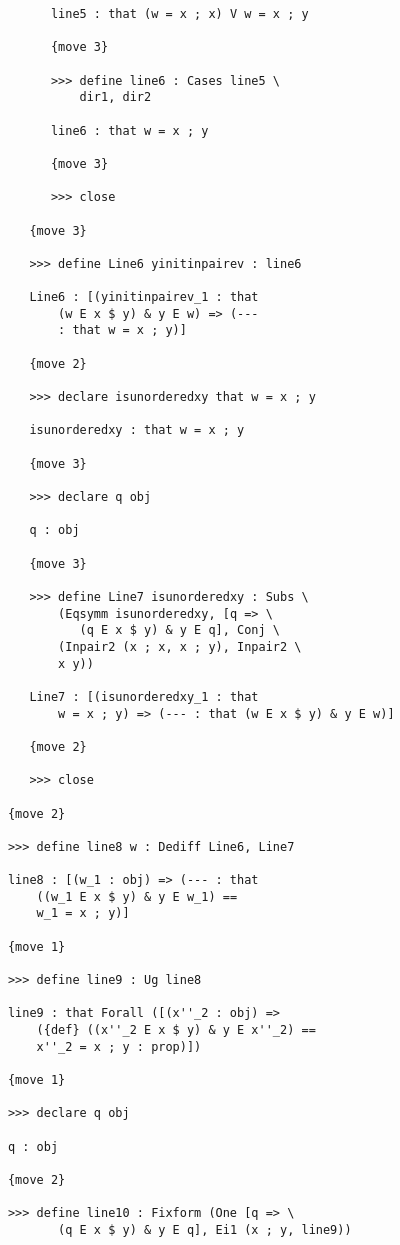 \documentclass[12pt]{article}
\begin{document}
\begin{verbatim}
            line5 : that (w = x ; x) V w = x ; y

            {move 3}

            >>> define line6 : Cases line5 \
                dir1, dir2

            line6 : that w = x ; y

            {move 3}

            >>> close

         {move 3}

         >>> define Line6 yinitinpairev : line6

         Line6 : [(yinitinpairev_1 : that 
             (w E x $ y) & y E w) => (--- 
             : that w = x ; y)]

         {move 2}

         >>> declare isunorderedxy that w = x ; y

         isunorderedxy : that w = x ; y

         {move 3}

         >>> declare q obj

         q : obj

         {move 3}

         >>> define Line7 isunorderedxy : Subs \
             (Eqsymm isunorderedxy, [q => \
                (q E x $ y) & y E q], Conj \
             (Inpair2 (x ; x, x ; y), Inpair2 \
             x y))

         Line7 : [(isunorderedxy_1 : that 
             w = x ; y) => (--- : that (w E x $ y) & y E w)]

         {move 2}

         >>> close

      {move 2}

      >>> define line8 w : Dediff Line6, Line7

      line8 : [(w_1 : obj) => (--- : that 
          ((w_1 E x $ y) & y E w_1) == 
          w_1 = x ; y)]

      {move 1}

      >>> define line9 : Ug line8

      line9 : that Forall ([(x''_2 : obj) => 
          ({def} ((x''_2 E x $ y) & y E x''_2) == 
          x''_2 = x ; y : prop)])

      {move 1}

      >>> declare q obj

      q : obj

      {move 2}

      >>> define line10 : Fixform (One [q => \
             (q E x $ y) & y E q], Ei1 (x ; y, line9))


\end{verbatim}
\end{document}
